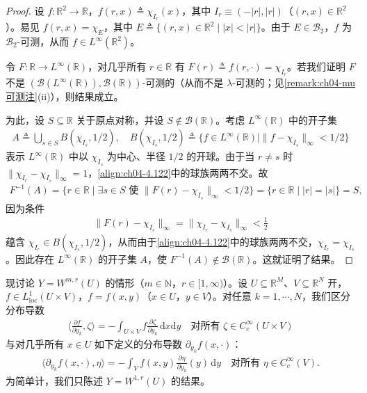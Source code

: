 \documentclass[../../main.tex]{subfiles}%
\begin{document}
\begin{proof}
设 $f:\mathbb{R}^2\to\mathbb{R}$，$f(r,x)\triangleq \chi_{I_r}(x)$，其中 $I_r\equiv(-|r|,|r|)$（$(r,x)\in\mathbb{R}^2$）。易见 $f(r,x)=\chi_E$，其中 $E\triangleq \{(r,x)\in\mathbb{R}^2\mid |x|<|r|\}$。由于 $E\in\mathcal{B}_2$，$f$ 为 $\mathcal{B}_2$-可测，从而 $f\in L^\infty(\mathbb{R}^2)$。

令 $F:\mathbb{R}\to L^\infty(\mathbb{R})$，对几乎所有 $r\in\mathbb{R}$ 有 $F(r)\triangleq f(r,\cdot)=\chi_{I_r}$。若我们证明 $F$ 不是 $(\mathcal{B}(L^\infty(\mathbb{R})),\mathcal{B}(\mathbb{R}))$-可测的（从而不是 $\lambda$-可测的；见\cref{remark:ch04-mu可测注}(ii)），则结果成立。

为此，设 $S\subseteq\mathbb{R}$ 关于原点对称，并设 $S\notin\mathcal{B}(\mathbb{R})$。考虑 $L^\infty(\mathbb{R})$ 中的开子集
\begin{align}
A\triangleq \bigcup_{s\in S}B(\chi_{I_s},1/2),\quad B(\chi_{I_s},1/2)\triangleq \{f\in L^\infty(\mathbb{R})\mid\|f-\chi_{I_s}\|_\infty<1/2\} \label{align:ch04-4.122}
\end{align}
表示 $L^\infty(\mathbb{R})$ 中以 $\chi_{I_s}$ 为中心、半径 $1/2$ 的开球。由于当 $r\neq s$ 时 $\|\chi_{I_r}-\chi_{I_s}\|_\infty=1$，\eqref{align:ch04-4.122}中的球族两两不交。故
\begin{align*}
F^{-1}(A)=\{r\in\mathbb{R}\mid\exists s\in S\text{ 使 }\|F(r)-\chi_{I_s}\|_\infty<1/2\}
=\{r\in\mathbb{R}\mid |r|=|s|\}=S,
\end{align*}
因为条件
\begin{align*}
\|F(r)-\chi_{I_s}\|_\infty=\|\chi_{I_r}-\chi_{I_s}\|_\infty<\frac12
\end{align*}
蕴含 $\chi_{I_r}\in B(\chi_{I_s},1/2)$，从而由于\eqref{align:ch04-4.122}中的球族两两不交，$\chi_{I_r}=\chi_{I_s}$。因此存在 $L^\infty(\mathbb{R})$ 的开子集 $A$，使 $F^{-1}(A)\notin\mathcal{B}(\mathbb{R})$。这就证明了结果。
\end{proof}

现讨论 $Y=W^{m,r}(U)$ 的情形（$m\in\mathbb{N}$，$r\in[1,\infty)$）。设 $U\subseteq\mathbb{R}^M$、$V\subseteq\mathbb{R}^N$ 开，$f\in L^1_{\mathrm{loc}}(U\times V)$，$f=f(x,y)$（$x\in U$，$y\in V$）。对任意 $k=1,\cdots ,N$，我们区分分布导数
\begin{align}
\Big\langle\frac{\partial f}{\partial y_k},\zeta\Big\rangle=-\int_{U\times V}f\frac{\partial\zeta}{\partial y_k}\,\mathrm{d}x\mathrm{d}y\quad\text{对所有 }\zeta\in C_c^\infty(U\times V) \label{align:ch04-4.123a}
\end{align}
与对几乎所有 $x\in U$ 如下定义的分布导数 $\partial_{y_k}f(x,\cdot)$：
\begin{align}
\langle\partial_{y_k}f(x,\cdot),\eta\rangle=-\int_V f(x,y)\frac{\partial\eta}{\partial y_k}(y)\,\mathrm{d}y\quad\text{对所有 }\eta\in C_c^\infty(V). \label{align:ch04-4.123b}
\end{align}
为简单计，我们只陈述 $Y=W^{1,r}(U)$ 的结果。
\end{document}
